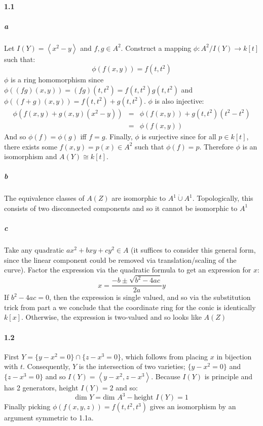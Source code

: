 \documentclass{article}
\begin{document}
\paragraph{1.1}
\subparagraph{a} Let $I(Y) = \left \langle x^2 - y \right \rangle$ and $f,g \in A^2$.  Construct a mapping $\phi : A^2 / I(Y) \rightarrow k[t]$ such that:
\[ \phi ( f(x, y) ) = f(t, t^2) \]
$\phi$ is a ring homomorphism since $\phi( (f g)(x,y) ) = (f g)(t, t^2) = f(t,t^2) g(t,t^2)$ and $\phi((f + g)(x,y)) = f(t,t^2) + g(t,t^2)$.  $\phi$ is also injective:
\begin{eqnarray*}
\phi( f(x,y) + g(x,y) (x^2 - y) ) & = & \phi(f(x,y)) + g(t,t^2) (t^2 - t^2) \\
	& = & \phi(f(x,y))
\end{eqnarray*}
And so $\phi(f) = \phi(g)$ iff $f = g$.  Finally, $\phi$ is surjective since for all $p \in k[t]$, there exists some $f(x,y) = p(x) \in A^2$ such that $\phi(f) = p$.  Therefore $\phi$ is an isomorphism and $A(Y) \cong k[t]$.

\subparagraph{b}
The equivalence classes of $A(Z)$ are isomorphic to $A^1 \dot{\cup} A^1$.  Topologically, this consists of two disconnected components and so it cannot be isomorphic to $A^1$

\subparagraph{c}
Take any quadratic $a x^2 + b x y + c y ^2 \in A$ (it suffices to consider this general form, since the linear component could be removed via translation/scaling of the curve).  Factor the expression via the quadratic formula to get an expression for $x$:
\[ x = \frac{-b \pm \sqrt{b^2 - 4 a c} } { 2 a } y \]
If $b^2 - 4 a c =  0$, then the expression is single valued, and so via the substitution trick from part a we conclude that the coordinate ring for the conic is identically $k[x]$.  Otherwise, the expression is two-valued and so looks like $A(Z)$

\paragraph{1.2}
First $Y = \{ y - x^2 = 0 \} \cap \{ z - x^3 = 0 \}$, which follows from placing $x$ in bijection with $t$.  Consequently, $Y$ is the intersection of two varieties; $\{ y - x^2 = 0 \}$ and $\{ z - x^3 = 0 \}$ and so $I(Y) = \left \langle y - x^2, z - x^3 \right \rangle $.  Because $I(Y)$ is principle and has 2 generators, $\textrm{height }I(Y) = 2$ and so:
\[ \textrm{dim } Y = \textrm{dim }A^3 - \textrm{height }I(Y) = 1 \]
Finally picking $\phi( f(x,y,z) ) = f(t, t^2, t^3)$ gives an isomorphism by an argument symmetric to 1.1a.
\end{document}
